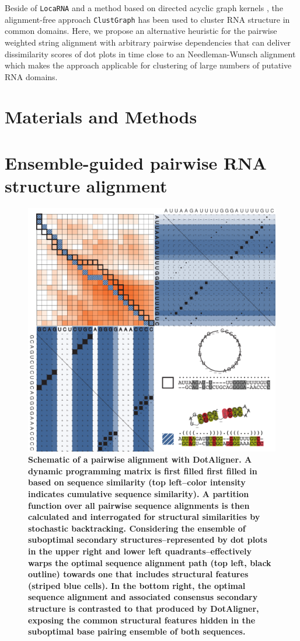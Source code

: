 \documentclass[a4paper,11pt]{article}
\newcommand\clustgraph{\texttt{ClustGraph}}
\newcommand\locarna{\texttt{LocaRNA}}
\begin{document}
Beside of \locarna{} and a method based on directed acyclic graph kernels
\cite{Sato18647390}, the alignment-free approach \clustgraph{}
\cite{Heyne22689765} has been used to cluster RNA structure in common domains.
Here, we propose an alternative heuristic for the pairwise weighted string
alignment with arbitrary pairwise dependencies that can deliver dissimilarity
scores of dot plots in time close to an Needleman-Wunsch alignment which makes
the approach applicable for clustering of large numbers of putative RNA domains.

\section{ Materials and Methods }
\section*{ Ensemble-guided pairwise RNA structure alignment} 

\begin{figure}
 \includegraphics[width=\textwidth]{figX}
\caption \textbf{{Schematic of a pairwise alignment with DotAligner.} 
  A dynamic  programming matrix is first filled first filled in based on sequence 
  similarity (top left--color intensity indicates cumulative sequence similarity). 
  A partition function over all pairwise sequence alignments is then calculated and 
  interrogated for structural similarities by stochastic backtracking. Considering 
  the ensemble of suboptimal secondary structures--represented by dot plots in the 
  upper right and lower left quadrants--effectively warps the optimal sequence alignment 
  path (top left, black outline) towards one that includes structural features 
  (striped blue cells).  In the bottom right, the optimal sequence alignment 
  and associated consensus secondary structure is contrasted to that produced 
  by DotAligner, exposing the common structural features hidden in the suboptimal 
  base pairing ensemble of both sequences. 
 }
\end{figure}
\end{document}
